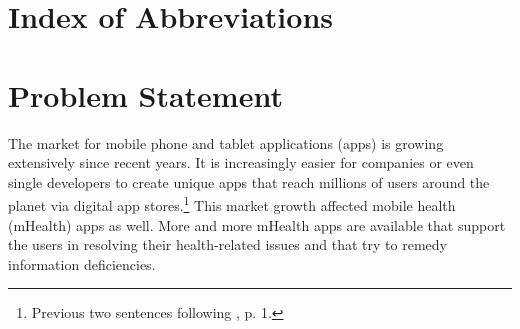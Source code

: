 \documentclass[
	a4paper,
	oneside,
	12pt,
	liststotocnumbered
]{article}
\let\cite\textcite
\begin{document}
\renewcommand{\figurename}{Figure}
\renewcommand{\tablename}{Table}
\renewcommand\thefigure{\arabic{section}-\arabic{figure}}
\renewcommand\thetable{Tab. \arabic{section}-\arabic{table}}
\newcommand{\todo}[1]{\textbf{\textsc{\textcolor{red}{TODO: #1}}}}

\newcommand{\mH}{mHealth }
\newcommand{\ap}{app provider }
\newcommand{\pp}{privacy policy }
\newcommand{\pps}{privacy policies }
\newcommand{\sca}{static code analysis }
\newcommand{\Sca}{Static code analysis }
\newcommand{\pra}{privacy risk assessment }




\tableofcontents
\newpage

\section*{Index of Abbreviations}
\begin{acronym}[TTTTTTTTTTTTTTTTTTTT]
\end{acronym}
\newpage

\normalsize
{}

\section{Problem Statement}
The market for mobile phone and tablet applications (apps) is growing extensively since recent years.
It is increasingly easier for companies or even single developers to create unique apps that reach millions of users around the planet via digital app stores.\footnote{Previous two sentences following \cite{Enck2011}, p. 1.}
This market growth affected mobile health (\acs{mHealth}) apps as well. 
More and more \mH apps are available that support the users in resolving their health-related issues and that try to remedy information deficiencies. 
\end{document}
